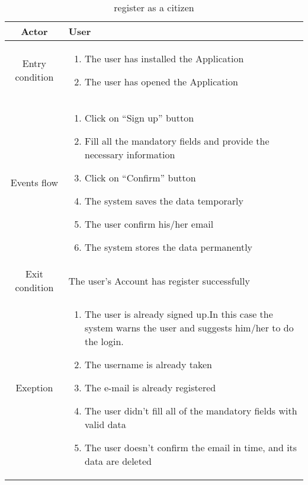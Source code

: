 \documentclass{article}
\begin{document}
		\begin{table} [H]
		\begin{center}
		\caption{register as a citizen}
		\begin{tabular}{|c|p{8cm}|}
			\hline
			Actor&User\\
			\hline
			Entry condition & \begin{enumerate}
								\item The user has installed the Application
								\item The user has opened the Application
							\end{enumerate}\\
			\hline
			Events flow & \begin{enumerate}
							\item Click on “Sign up” button
							\item Fill all the mandatory fields and provide the necessary information
							\item Click on “Confirm” button
							\item The system saves the data temporarly
							\item The user confirm his/her email
							\item The system stores the data permanently
							
						\end{enumerate}\\
			\hline
			Exit condition & The user's Account has register successfully\\
			\hline
			Exeption & \begin{enumerate}
							\item The user is already signed up.In this case the system warns the user and suggests him/her to do the login.
							\item The username is already taken
							\item The e-mail is already registered
							\item The user didn’t fill all of the mandatory fields with valid data
							\item The user doesn't confirm the email in time, and its data are deleted
						\end{enumerate}\\
			\hline
		\end{tabular}	
		\end{center}
		\end{table} 
\end{document}
